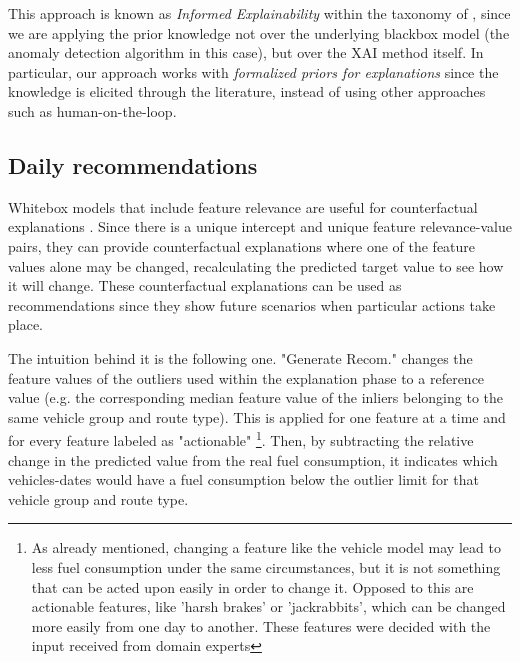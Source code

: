This approach is known as \textit{Informed Explainability} within the taxonomy of \parencite{beckh2021explainable}, since we are applying the prior knowledge not over the underlying blackbox model (the anomaly detection algorithm in this case), but over the XAI method itself. In particular, our approach works with \textit{formalized priors for explanations} since the knowledge is elicited through the literature, instead of using other approaches such as human-on-the-loop.

\subsection{Daily recommendations}\label{subsec:ch6-daily-recommendations}
Whitebox models that include feature relevance are useful for counterfactual explanations \parencite{arrieta2020explainable}. Since there is a unique intercept and unique feature relevance-value pairs, they can provide counterfactual explanations where one of the feature values alone may be changed, recalculating the predicted target value to see how it will change. These counterfactual explanations can be used as recommendations since they show future scenarios when particular actions take place.

The intuition behind it is the following one. "Generate Recom." changes the feature values of the outliers used within the explanation phase to a reference value (e.g. the corresponding median feature value of the inliers belonging to the same vehicle group and route type). This is applied for one feature at a time and for every feature labeled as "actionable" \footnote{As already mentioned, changing a feature like the vehicle model may lead to less fuel consumption under the same circumstances, but it is not something that can be acted upon easily in order to change it. Opposed to this are actionable features, like 'harsh brakes' or 'jackrabbits', which can be changed more easily from one day to another. These features were decided with the input received from domain experts}. Then, by subtracting the relative change in the predicted value from the real fuel consumption, it indicates which vehicles-dates would have a fuel consumption below the outlier limit for that vehicle group and route type. 

